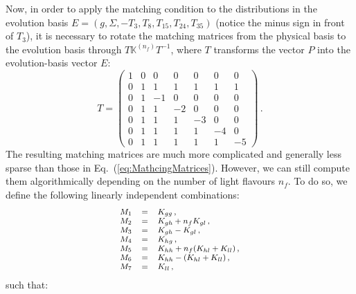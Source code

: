 \documentclass[10pt,a4paper]{article}
\begin{document}
Now, in order to apply the matching condition to the distributions in
the evolution basis $E=(g,\Sigma,-T_3,T_8,T_{15},T_{24},T_{35})$
(notice the minus sign in front of $T_3$), it is necessary to rotate
the matching matrices from the physical basis to the evolution basis
through $T\mathbb{K}^{(n_f)}T^{-1}$, where $T$ transforms the vector
$P$ into the evolution-basis vector $E$:
\begin{equation}
T = 
\begin{pmatrix}
1 & 0 & 0  & 0  & 0  & 0  & 0 \\
0 & 1 & 1  & 1  & 1  & 1  & 1 \\
0 & 1 & -1  & 0  & 0  & 0  & 0 \\
0 & 1 & 1  & -2  & 0  & 0  & 0 \\
0 & 1 & 1  & 1  & -3  & 0  & 0 \\
0 & 1 & 1  & 1  & 1  & -4  & 0 \\
0 & 1 & 1  & 1  & 1  & 1  & -5
\end{pmatrix}\,.
\label{eq:RotationMatrix}
\end{equation}
The resulting matching matrices are much more complicated and
generally less sparse than those in
Eq.~(\ref{eq:MathcingMatrices}). However, we can still compute them
algorithmically depending on the number of light flavours $n_f$. To do
so, we define the following linearly independent combinations:
\begin{equation}
\footnotesize
\begin{array}{lcl}
M_1 &=& K_{gg}\,,\\
M_2 &=& K_{gh} + n_f K_{gl}\,,\\
M_3 &=& K_{gh}-K_{gl}\,,\\
M_4 &=& K_{hg}\,,\\
M_5 &=& K_{hh}+n_f(K_{hl}+K_{ll}) \,,\\
M_6 &=& K_{hh}-(K_{hl}+K_{ll})\,,\\
M_7 &=& K_{ll}\,,
\end{array}
\end{equation}
such that:
\end{document}

